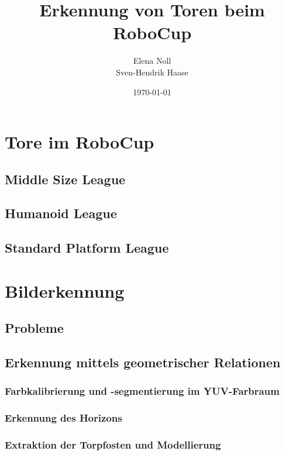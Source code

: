 \documentclass[a4paper,12pt]{article}
\begin{document}
\begin{titlepage}
\author{Elena Noll\\
		Sven-Hendrik Haase}
\title{Erkennung von Toren beim RoboCup} 
\date{\today} 
\maketitle
\thispagestyle{empty}
\end{titlepage}

\tableofcontents

\newpage

\section{Tore im RoboCup}
\cite{lamport94}
\subsection{Middle Size League}
\subsection{Humanoid League}
\subsection{Standard Platform League}

\section{Bilderkennung}
\subsection{Probleme}
\subsection{Erkennung mittels geometrischer Relationen}
\subsubsection{Farbkalibrierung und -segmentierung im YUV-Farbraum}
\subsubsection{Erkennung des Horizons}
\subsubsection{Extraktion der Torpfosten und Modellierung}
\end{document}
